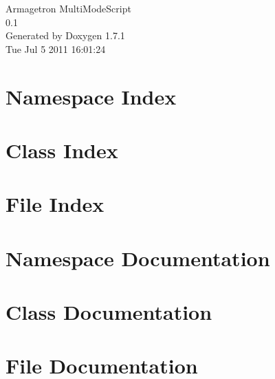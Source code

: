 \documentclass[a4paper]{book}
\begin{document}
\hypersetup{pageanchor=false}
\begin{titlepage}
\vspace*{7cm}
\begin{center}
{\Large Armagetron MultiModeScript \\[1ex]\large 0.1 }\\
\vspace*{1cm}
{\large Generated by Doxygen 1.7.1}\\
\vspace*{0.5cm}
{\small Tue Jul 5 2011 16:01:24}\\
\end{center}
\end{titlepage}
\clearemptydoublepage
{}
\tableofcontents
\clearemptydoublepage
{}
\hypersetup{pageanchor=true}
\chapter{Namespace Index}

\chapter{Class Index}

\chapter{File Index}

\chapter{Namespace Documentation}





\chapter{Class Documentation}











\chapter{File Documentation}














\printindex
\end{document}
